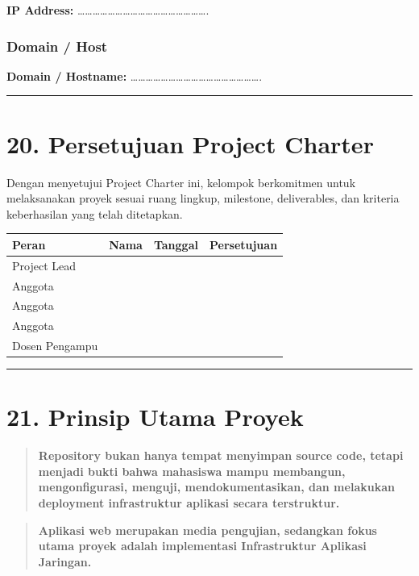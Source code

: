 \documentclass[
]{article}
\begin{document}
\textbf{IP Address:}
\ldots\ldots\ldots\ldots\ldots\ldots\ldots\ldots\ldots\ldots\ldots\ldots\ldots\ldots\ldots\ldots\ldots.

\subsubsection{Domain / Host}\label{domain-host}

\textbf{Domain / Hostname:}
\ldots\ldots\ldots\ldots\ldots\ldots\ldots\ldots\ldots\ldots\ldots\ldots\ldots\ldots\ldots\ldots\ldots.

\begin{center}\rule{0.5\linewidth}{0.5pt}\end{center}

\section{20. Persetujuan Project
Charter}\label{persetujuan-project-charter}

Dengan menyetujui Project Charter ini, kelompok berkomitmen untuk
melaksanakan proyek sesuai ruang lingkup, milestone, deliverables, dan
kriteria keberhasilan yang telah ditetapkan.

\begin{longtable}[]{@{}llll@{}}
\toprule\noalign{}
Peran & Nama & Tanggal & Persetujuan \\
\midrule\noalign{}
\endhead
\bottomrule\noalign{}
\endlastfoot
Project Lead & & & \\
Anggota & & & \\
Anggota & & & \\
Anggota & & & \\
Dosen Pengampu & & & \\
\end{longtable}

\begin{center}\rule{0.5\linewidth}{0.5pt}\end{center}

\section{21. Prinsip Utama Proyek}\label{prinsip-utama-proyek}

\begin{quote}
\textbf{Repository bukan hanya tempat menyimpan source code, tetapi
menjadi bukti bahwa mahasiswa mampu membangun, mengonfigurasi, menguji,
mendokumentasikan, dan melakukan deployment infrastruktur aplikasi
secara terstruktur.}
\end{quote}

\begin{quote}
\textbf{Aplikasi web merupakan media pengujian, sedangkan fokus utama
proyek adalah implementasi Infrastruktur Aplikasi Jaringan.}
\end{quote}
\end{document}
